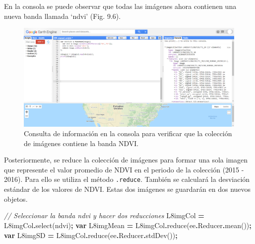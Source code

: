 \documentclass[
  12pt,
  letterpaper,
  twoside]{book}
\newenvironment{Shaded}{\begin{snugshade}}{\end{snugshade}}
\newcommand{\AttributeTok}[1]{\textcolor[rgb]{0.77,0.63,0.00}{#1}}
\newcommand{\CommentTok}[1]{\textcolor[rgb]{0.56,0.35,0.01}{\textit{#1}}}
\newcommand{\FunctionTok}[1]{\textcolor[rgb]{0.00,0.00,0.00}{#1}}
\newcommand{\KeywordTok}[1]{\textcolor[rgb]{0.13,0.29,0.53}{\textbf{#1}}}
\newcommand{\NormalTok}[1]{#1}
\newcommand{\OperatorTok}[1]{\textcolor[rgb]{0.81,0.36,0.00}{\textbf{#1}}}
\newcommand{\StringTok}[1]{\textcolor[rgb]{0.31,0.60,0.02}{#1}}
\begin{document}
En la consola se puede observar que todas las imágenes ahora contienen una nueva banda llamada `ndvi' (Fig. 9.6).

\begin{figure}[btp]

{\centering \includegraphics[width=1\linewidth]{Img/imConNDVI} 

}

\caption{Consulta de información en la consola para verificar que la colección de imágenes contiene la banda NDVI.}\label{fig:unnamed-chunk-158}
\end{figure}

Posteriormente, se reduce la colección de imágenes para formar una sola imagen que represente el valor promedio de NDVI en el periodo de la colección (2015 - 2016). Para ello se utiliza el método \texttt{.reduce}. También se calculará la desviación estándar de los valores de NDVI. Estas dos imágenes se guardarán en dos nuevos objetos.

\begin{Shaded}
\begin{Highlighting}[]
\CommentTok{// Seleccionar la banda ndvi y hacer dos reducciones}
\NormalTok{L8imgCol }\OperatorTok{=}\NormalTok{ L8imgCol}\OperatorTok{.}\FunctionTok{select}\NormalTok{(}\StringTok{\textquotesingle{}ndvi\textquotesingle{}}\NormalTok{)}\OperatorTok{;}
\KeywordTok{var}\NormalTok{ L8imgMean }\OperatorTok{=}\NormalTok{ L8imgCol}\OperatorTok{.}\FunctionTok{reduce}\NormalTok{(ee}\OperatorTok{.}\AttributeTok{Reducer}\OperatorTok{.}\FunctionTok{mean}\NormalTok{())}\OperatorTok{;}
\KeywordTok{var}\NormalTok{ L8imgSD }\OperatorTok{=}\NormalTok{ L8imgCol}\OperatorTok{.}\FunctionTok{reduce}\NormalTok{(ee}\OperatorTok{.}\AttributeTok{Reducer}\OperatorTok{.}\FunctionTok{stdDev}\NormalTok{())}\OperatorTok{;}
\end{Highlighting}
\end{Shaded}
\end{document}
